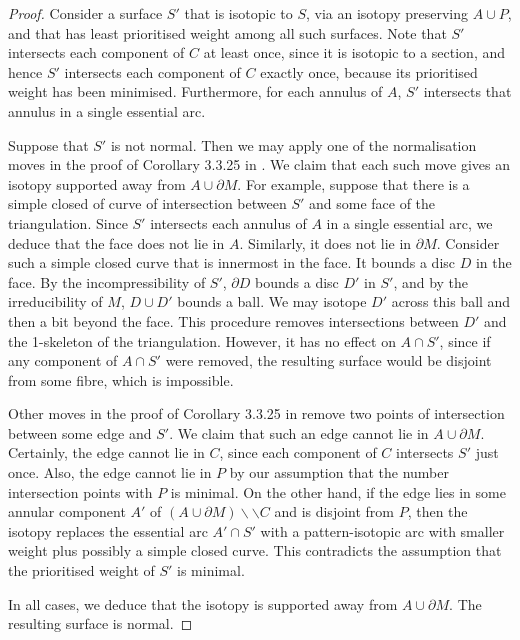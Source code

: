 \documentclass[oneside]{amsart}
\numberwithin{equation}{section}
\theoremstyle{plain}
\theoremstyle{definition}
\newcommand{\cut}{\backslash\backslash}
\begin{document}
\begin{proof}
Consider a surface $S'$ that is isotopic to $S$, via an isotopy preserving $A \cup P$, and that has least prioritised weight
among all such surfaces. Note that $S'$ intersects each component of
$C$ at least once, since it is isotopic to a section, and hence $S'$ intersects each component
of $C$ exactly once, because its prioritised weight has been minimised. Furthermore, for each annulus of $A$, $S'$ intersects that
annulus in a single essential arc.

Suppose that $S'$ is not normal. Then we may apply one of the
normalisation moves in the proof of Corollary 3.3.25  in \cite{Matveev}. We claim that each
such move gives an isotopy supported away from $A \cup \partial M$. For example, suppose that
there is a simple closed of curve of intersection between $S'$ and some face of the triangulation.
Since $S'$ intersects each annulus of $A$ in a single essential arc, we deduce that the face does
not lie in $A$. Similarly, it does not lie in $\partial M$. Consider such a simple closed curve that is innermost in the face. It bounds
a disc $D$ in the face. By the incompressibility of $S'$, $\partial D$ bounds a disc $D'$ in $S'$,
and by the irreducibility of $M$, $D \cup D'$ bounds a ball. We may isotope $D'$ across this ball
and then a bit beyond the face. This procedure removes intersections between $D'$ and the 1-skeleton
of the triangulation. However, it has no effect on $A \cap S'$, since if any component of $A \cap S'$
were removed, the resulting surface would be disjoint from some fibre, which is impossible.

Other moves in the proof of Corollary 3.3.25  in \cite{Matveev} remove two points of intersection between
some edge and $S'$. We claim that such an edge cannot lie in $A \cup \partial M$. Certainly, the edge cannot lie in $C$,
since each component of $C$ intersects $S'$ just once. Also, the edge cannot lie in $P$ by our assumption
that the number intersection points with $P$ is minimal. On the other hand, if the edge lies in some
annular component $A'$ of $(A \cup \partial M) \cut C$ and is disjoint from $P$, then the isotopy replaces the essential arc $A' \cap S'$ with a pattern-isotopic
arc with smaller weight plus possibly a simple closed curve. This contradicts the assumption that the prioritised weight of $S'$ is minimal.

In all cases, we deduce that the isotopy is supported away from $A \cup \partial M$. The resulting surface is normal.
\end{proof}
\end{document}

